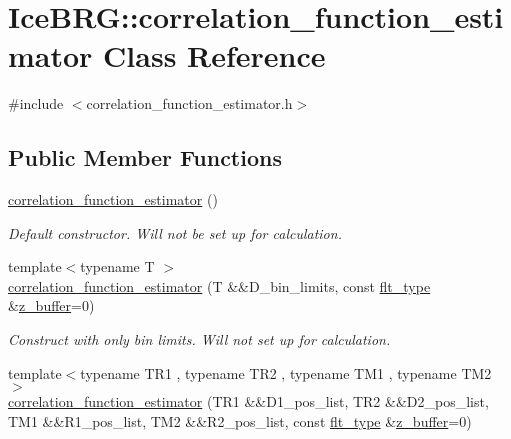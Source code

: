 \hypertarget{classIceBRG_1_1correlation__function__estimator}{}\section{Ice\+B\+R\+G\+:\+:correlation\+\_\+function\+\_\+estimator Class Reference}
\label{classIceBRG_1_1correlation__function__estimator}


{\ttfamily \#include $<$correlation\+\_\+function\+\_\+estimator.\+h$>$}

\subsection*{Public Member Functions}
\begin{DoxyCompactItemize}
\item 
\hyperlink{classIceBRG_1_1correlation__function__estimator_a52c4f409a89854934fd34afad5166566}{correlation\+\_\+function\+\_\+estimator} ()
\begin{DoxyCompactList}\small\item\em Default constructor. Will not be set up for calculation. \end{DoxyCompactList}\item 
{\footnotesize template$<$typename T $>$ }\\\hyperlink{classIceBRG_1_1correlation__function__estimator_a26f8e8c187185aec13fc53ba9593be35}{correlation\+\_\+function\+\_\+estimator} (T \&\&D\+\_\+bin\+\_\+limits, const \hyperlink{lib_2IceBRG__main_2common_8h_ad0f130a56eeb944d9ef2692ee881ecc4}{flt\+\_\+type} \&\hyperlink{magic__values_8hpp_a424f49a8036e9de5962c718fb785356f}{z\+\_\+buffer}=0)
\begin{DoxyCompactList}\small\item\em Construct with only bin limits. Will not set up for calculation. \end{DoxyCompactList}\item 
{\footnotesize template$<$typename T\+R1 , typename T\+R2 , typename T\+M1 , typename T\+M2 $>$ }\\\hyperlink{classIceBRG_1_1correlation__function__estimator_ac4d2c23263bdf8ea610e29e01a0bda5f}{correlation\+\_\+function\+\_\+estimator} (T\+R1 \&\&D1\+\_\+pos\+\_\+list, T\+R2 \&\&D2\+\_\+pos\+\_\+list, T\+M1 \&\&R1\+\_\+pos\+\_\+list, T\+M2 \&\&R2\+\_\+pos\+\_\+list, const \hyperlink{lib_2IceBRG__main_2common_8h_ad0f130a56eeb944d9ef2692ee881ecc4}{flt\+\_\+type} \&\hyperlink{magic__values_8hpp_a424f49a8036e9de5962c718fb785356f}{z\+\_\+buffer}=0)

\end{DoxyCompactItemize}
